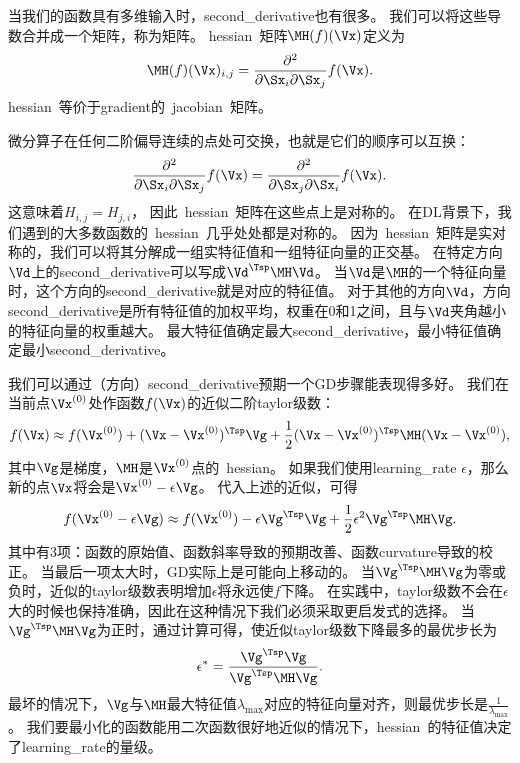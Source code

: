 当我们的函数具有多维输入时，\gls{second_derivative}也有很多。
我们可以将这些导数合并成一个矩阵，称为矩阵。
\gls{hessian}~矩阵$\MH(f)(\Vx)$定义为
\begin{align}
 \MH(f)(\Vx)_{i,j} = \frac{\partial^2}{\partial \Sx_i \partial  \Sx_j} f(\Vx).
\end{align}
\gls{hessian}~等价于\gls{gradient}的~\gls{jacobian}~矩阵。


微分算子在任何二阶偏导连续的点处可交换，也就是它们的顺序可以互换：
\begin{align}
 \frac{\partial^2}{\partial \Sx_i \partial \Sx_j} f(\Vx) = \frac{\partial^2}{\partial \Sx_j\partial \Sx_i} f(\Vx) .
\end{align}
这意味着$H_{i,j} = H_{j,i}$， 因此~\gls{hessian}~矩阵在这些点上是对称的。
在\gls{DL}背景下，我们遇到的大多数函数的~\gls{hessian}~几乎处处都是对称的。
因为~\gls{hessian}~矩阵是实对称的，我们可以将其分解成一组实特征值和一组特征向量的正交基。
在特定方向$\Vd$上的\gls{second_derivative}可以写成$\Vd^\Tsp \MH \Vd$。
当$\Vd$是$\MH$的一个特征向量时，这个方向的\gls{second_derivative}就是对应的特征值。
对于其他的方向$\Vd$，方向\gls{second_derivative}是所有特征值的加权平均，权重在0和1之间，且与$\Vd$夹角越小的特征向量的权重越大。
最大特征值确定最大\gls{second_derivative}，最小特征值确定最小\gls{second_derivative}。


我们可以通过（方向）\gls{second_derivative}预期一个\gls{GD}步骤能表现得多好。
我们在当前点$\Vx^{(0)}$处作函数$f(\Vx)$的近似二阶\gls{taylor}级数：
\begin{align}
 f(\Vx) \approx f(\Vx^{(0)}) + (\Vx - \Vx^{(0)})^\Tsp \Vg + 
 \frac{1}{2}  (\Vx - \Vx^{(0)})^\Tsp \MH  (\Vx - \Vx^{(0)}),
\end{align}
其中$\Vg$是梯度，$\MH$是$ \Vx^{(0)}$点的~\gls{hessian}。
如果我们使用\gls{learning_rate} $\epsilon$，那么新的点$\Vx$将会是$\Vx^{(0)}-\epsilon \Vg$。
代入上述的近似，可得
\begin{align}
\label{eq:4.9}
 f(\Vx^{(0)} - \epsilon \Vg ) \approx f(\Vx^{(0)})  - \epsilon \Vg^\Tsp \Vg + \frac{1}{2} \epsilon^2 \Vg^\Tsp \MH  \Vg.
\end{align}
其中有3项：函数的原始值、函数斜率导致的预期改善、函数\gls{curvature}导致的校正。
当最后一项太大时，\gls{GD}实际上是可能向上移动的。
当$\Vg^\Tsp \MH  \Vg$为零或负时，近似的\gls{taylor}级数表明增加$\epsilon$将永远使$f$下降。
在实践中，\gls{taylor}级数不会在$\epsilon$大的时候也保持准确，因此在这种情况下我们必须采取更启发式的选择。
当$\Vg^\Tsp \MH  \Vg$为正时，通过计算可得，使近似\gls{taylor}级数下降最多的最优步长为
\begin{align}
 \epsilon^* = \frac{ \Vg^\Tsp \Vg}{ \Vg^\Tsp \MH  \Vg} .
\end{align}
最坏的情况下，$\Vg$与$\MH$最大特征值$\lambda_{\max}$对应的特征向量对齐，则最优步长是$\frac{1}{\lambda_{\max}}$。
我们要最小化的函数能用二次函数很好地近似的情况下，\gls{hessian}~的特征值决定了\gls{learning_rate}的量级。

